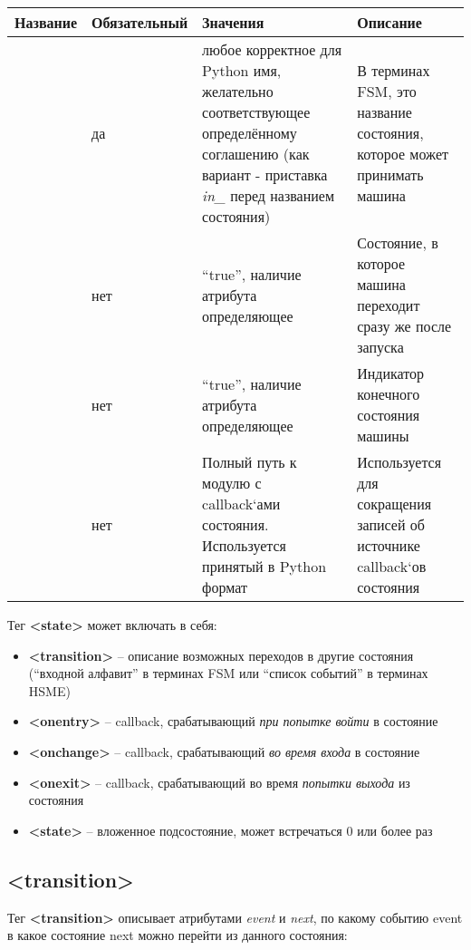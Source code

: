 \documentclass[letterpaper,10pt,english]{sphinxmanual}
\begin{document}
\begin{tabulary}{\linewidth}{|L|L|L|L|}
\hline
\textsf{\relax 
Название
} & \textsf{\relax 
Обязательный
} & \textsf{\relax 
Значения
} & \textsf{\relax 
Описание
}\\
\hline
{}
 & 
да
 & 
любое корректное для Python имя, желательно
соответствующее определённому соглашению
(как вариант - приставка \emph{in\_} перед
названием состояния)
 & 
В терминах FSM, это название состояния,
которое может принимать машина
\\

 & 
нет
 & 
``true'', наличие атрибута определяющее
 & 
Состояние, в которое машина переходит
сразу же после запуска
\\

 & 
нет
 & 
``true'', наличие атрибута определяющее
 & 
Индикатор конечного состояния машины
\\

 & 
нет
 & 
Полный путь к модулю с callback{}`ами состояния.
Используется принятый в Python формат
 & 
Используется для сокращения записей
об источнике callback{}`ов состояния
\\
\hline\end{tabulary}


Тег \textbf{\textless{}state\textgreater{}} может включать в себя:
\begin{itemize}
\item {} 
\textbf{\textless{}transition\textgreater{}} – описание возможных переходов в другие состояния (``входной алфавит'' в терминах FSM или ``список событий'' в терминах HSME)

\item {} 
\textbf{\textless{}onentry\textgreater{}} – callback, срабатывающий \emph{при попытке войти} в состояние

\item {} 
\textbf{\textless{}onchange\textgreater{}} – callback, срабатывающий \emph{во время входа} в состояние

\item {} 
\textbf{\textless{}onexit\textgreater{}} – callback, срабатывающий во время \emph{попытки выхода} из состояния

\item {} 
\textbf{\textless{}state\textgreater{}} – вложенное подсостояние, может встречаться 0 или более раз

\end{itemize}


\subsection{\textless{}transition\textgreater{}}
\label{xml_format:transition}
Тег \textbf{\textless{}transition\textgreater{}} описывает атрибутами \emph{event} и \emph{next}, по какому событию event в какое состояние next можно перейти из данного состояния:
\end{document}

